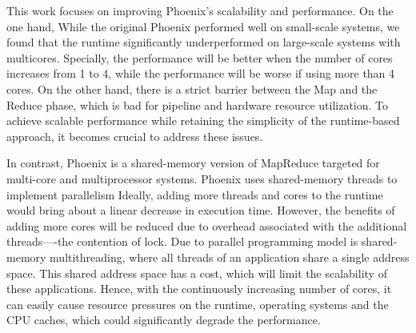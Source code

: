 This work focuses on improving Phoenix\cite{ranger2007phoenix}'s scalability and performance.
On the one hand, 
While the original Phoenix performed well on small-scale systems,
we found that the runtime significantly underperformed on large-scale systems with multicores.
Specially, the performance will be better 
when the number of cores increases from 1 to 4, 
while the performance will be worse if using more than 4 cores. 
On the other hand,
there is a strict barrier between the Map and the
Reduce phase, which is bad for pipeline and hardware resource utilization.
To achieve scalable performance while retaining
the simplicity of the runtime-based approach, 
it becomes crucial to address these issues.

In contrast, Phoenix is a shared-memory version of
MapReduce targeted for multi-core and multiprocessor systems.
Phoenix uses shared-memory threads to implement parallelism
Ideally, adding more threads and cores to the runtime
would bring about a linear decrease in execution time.
However, the benefits of adding more
cores will be reduced due to overhead associated with the
additional threads----the contention of lock.
Due to parallel programming model is shared-memory multithreading, 
where all threads of an application share a single address space. 
This shared address space has a
cost, which will limit the scalability of these applications. 
Hence, with the continuously increasing
number of cores, it can easily cause resource pressures on the
runtime, operating systems and the CPU caches, 
which could significantly degrade the performance. 


